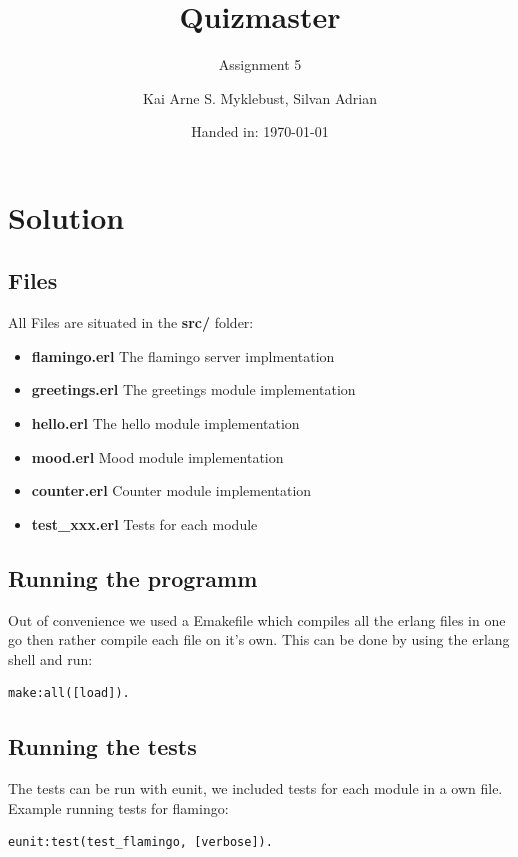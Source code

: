 \documentclass[12pt,a4paper]{article}
\begin{document}
\title{Quizmaster}
\subtitle{Assignment 5}

\author{Kai Arne S. Myklebust, Silvan Adrian}
\date{Handed in: \today}
	
\maketitle
\tableofcontents

\section{Solution}

\subsection{Files}
All Files are situated in the \textbf{src/} folder:
\begin{itemize}
	\item \textbf{flamingo.erl} The flamingo server implmentation
	\item \textbf{greetings.erl} The greetings module implementation
	\item \textbf{hello.erl} The hello module implementation
	\item \textbf{mood.erl} Mood module implementation
	\item \textbf{counter.erl} Counter module implementation
	\item \textbf{test\_xxx.erl} Tests for each module
\end{itemize}

\subsection{Running the programm}
Out of convenience we used a Emakefile which compiles all the erlang files in one go then rather compile each file on it's own.
This can be done by using the erlang shell and run:

\begin{verbatim}
make:all([load]).
\end{verbatim}

\subsection{Running the tests}
The tests can be run with eunit, we included tests for each module in a own file.
Example running tests for flamingo:
\begin{verbatim}
eunit:test(test_flamingo, [verbose]).
\end{verbatim}
\end{document}
